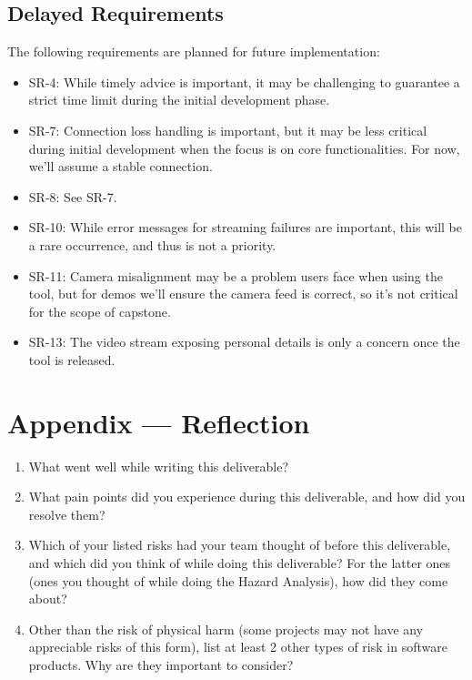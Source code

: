 \documentclass{article}
\begin{document}
\subsection{Delayed Requirements}\label{subsec:delayed-requirements}
The following requirements are planned for future implementation:
\begin{itemize}
    \item SR-4: While timely advice is important, it may be challenging to guarantee a strict time limit during the initial development phase.
    \item SR-7: Connection loss handling is important, but it may be less critical during initial development when the focus is on core functionalities.
          For now, we'll assume a stable connection.
    \item SR-8: See SR-7.
    \item SR-10: While error messages for streaming failures are important, this will be a rare occurrence, and thus is not a priority.
    \item SR-11: Camera misalignment may be a problem users face when using the tool, but for demos we'll ensure the camera feed is correct, so it's not critical for the scope of capstone.
    \item SR-13: The video stream exposing personal details is only a concern once the tool is released.
\end{itemize}


\newpage{}

\section*{Appendix --- Reflection}


% 

\begin{enumerate}
    \item What went well while writing this deliverable? 
    \item What pain points did you experience during this deliverable, and how
    did you resolve them?
    \item Which of your listed risks had your team thought of before this
    deliverable, and which did you think of while doing this deliverable? For
    the latter ones (ones you thought of while doing the Hazard Analysis), how
    did they come about?
    \item Other than the risk of physical harm (some projects may not have any
    appreciable risks of this form), list at least 2 other types of risk in
    software products. Why are they important to consider?
\end{enumerate}
\end{document}
